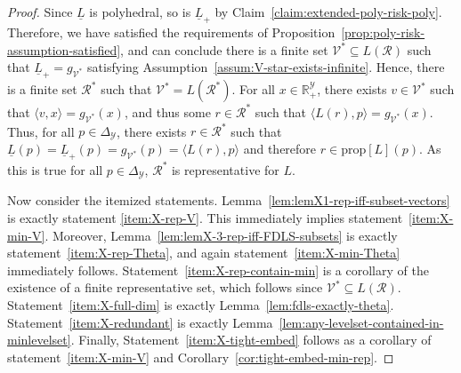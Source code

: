 \documentclass[twoside,11pt]{article}
\newcommand{\Comments}{1}
\newcommand{\mynote}[2]{\ifnum\Comments=1\textcolor{#1}{#2}\fi}
\newcommand{\mytodo}[2]{\ifnum\Comments=1%
  \todo[linecolor=#1!80!black,backgroundcolor=#1,bordercolor=#1!80!black]{#2}\fi}
\newcommand{\jessie}[1]{\mynote{teal}{[JF: #1]}}
\newcommand{\jessiet}[1]{\mytodo{teal!20!white}{JF: #1}}
\newcommand{\reals}{\mathbb{R}}
\newcommand{\prop}[1]{\mathrm{prop}[#1]}
\newcommand{\simplex}{\Delta_\Y}
\newcommand{\R}{\mathcal{R}}
\newcommand{\V}{\mathcal{V}}
\newcommand{\Y}{\mathcal{Y}}
\newcommand{\risk}[1]{\underline{#1}}
\newcommand{\inprod}[2]{\langle #1, #2 \rangle}%
\begin{document}
\lemmaX*
\begin{proof}
Since $\risk L$ is polyhedral, so is $\risk L_+$ by Claim~\ref{claim:extended-poly-risk-poly}.
Therefore, we have satisfied the requirements of Proposition~\ref{prop:poly-risk-assumption-satisfied}, and can conclude there is a finite set $\V^*\subseteq L(\R)$ such that $\risk L_+ = g_{\V^*}$ satisfying Assumption~\ref{assum:V-star-exists-infinite}.
Hence, there is a finite set $\R^*$ such that $\V^* = L(\R^*)$. %
For all $x\in\reals^\Y_+$, there exists $v \in \V^*$ such that $\inprod{v}{x} = g_{\V^*}(x)$, and thus some $r\in\R^*$ such that $\inprod{L(r)}{p} = g_{\V^*}(x)$.
Thus, for all $p \in \simplex$, there exists $r \in \R^*$ such that $\risk L(p) = \risk L_+(p) = g_{\V^*}(p) = \inprod{L(r)}{p}$ and therefore $r \in \prop{L}(p)$.
As this is true for all $p \in \simplex$, $\R^*$ is representative for $L$.


Now consider the itemized statements.
Lemma~\ref{lem:lemX1-rep-iff-subset-vectors} is exactly statement \eqref{item:X-rep-V}.
This immediately implies statement~\eqref{item:X-min-V}.
Moreover, Lemma~\ref{lem:lemX-3-rep-iff-FDLS-subsets} is exactly statement~\eqref{item:X-rep-Theta}, and again statement~\eqref{item:X-min-Theta} immediately follows.
Statement~\eqref{item:X-rep-contain-min} is a corollary of the existence of a finite representative set, which follows since $\V^* \subseteq L(\R)$.
Statement~\eqref{item:X-full-dim} is exactly Lemma~\ref{lem:fdls-exactly-theta}.
Statement~\eqref{item:X-redundant} is exactly Lemma~\ref{lem:any-levelset-contained-in-minlevelset}.
Finally, Statement~\eqref{item:X-tight-embed} follows as a corollary of statement~\eqref{item:X-min-V} and Corollary~\ref{cor:tight-embed-min-rep}.
\end{proof}
\end{document}
